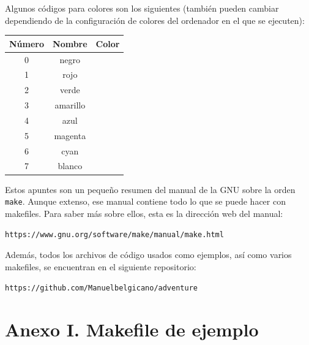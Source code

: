 \documentclass[11pt,twoside,titlepage,a4paper]{article}
\theoremstyle{definition}
\theoremstyle{plain_rojo}
\theoremstyle{remark}
\begin{document}
Algunos códigos para colores son los siguientes (también pueden cambiar 
dependiendo de la configuración de colores del ordenador en el que se 
ejecuten):
\begin{center}
\begin{tabular}{|c|c|c|}
\hline
	\textbf{\textcolor{burdeos}{Número}} & 
	\textbf{\textcolor{burdeos}{Nombre}} &
	\textbf{\textcolor{burdeos}{Color}} \\
\hline
	0 & negro & \cellcolor{negro-tput} \\
\hline
	1 & rojo & \cellcolor{rojo-tput} \\
\hline
	2 & verde & \cellcolor{verde-tput} \\
\hline
	3 & amarillo & \cellcolor{amarillo-tput} \\
\hline
	4 & azul & \cellcolor{azul-tput} \\
\hline
	5 & magenta & \cellcolor{magenta-tput} \\
\hline
	6 & cyan & \cellcolor{cyan-tput} \\
\hline
	7 & blanco & \cellcolor{blanco-tput} \\
\hline
\end{tabular}
\end{center}
\bigskip
Estos apuntes son un pequeño resumen del manual de la GNU sobre la orden
\texttt{make}. Aunque extenso, ese manual contiene todo lo que se puede hacer
con makefiles. Para saber más sobre ellos, esta es la dirección web del
manual: 
\begin{center}
\texttt{https://www.gnu.org/software/make/manual/make.html}
\end{center}
Además, todos los archivos de código usados como ejemplos, así como varios
makefiles, se encuentran en el siguiente repositorio:
\begin{center}
\texttt{https://github.com/Manuelbelgicano/adventure}
\end{center}

\newpage
\section{Anexo I. Makefile de ejemplo}
\end{document}
